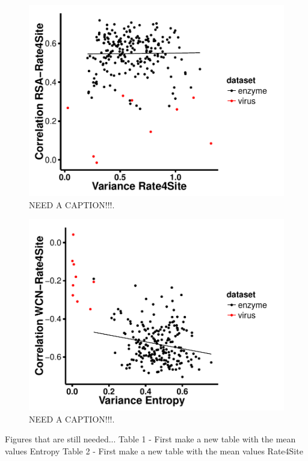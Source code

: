 \documentclass[12pt]{article}
\begin{document}
            \begin{figure}[H]
            \centerline{\includegraphics[width=5.0in]{var_rate_rsa_cor.pdf}}     
            \caption{NEED A CAPTION!!!.}
            \label{fig:seqent_structure_cors}
    \end{figure}
    
        \begin{figure}[H]
            \centerline{\includegraphics[width=5.0in]{var_entropy_rate_cor.pdf}}     
            \caption{NEED A CAPTION!!!.}
            \label{fig:seqent_structure_cors}
    \end{figure}
    
Figures that are still needed...
Table 1 - First make a new table with the mean values Entropy
Table 2 - First make a new table with the mean values Rate4Site
\end{document}
